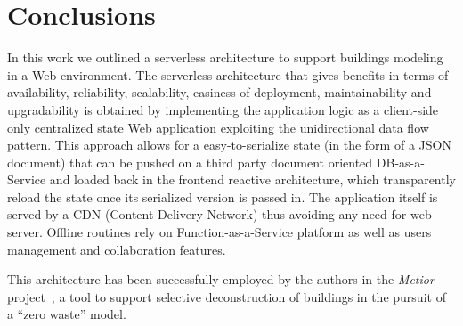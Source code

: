 \section{Conclusions}\label{sec:conclusions}

In this work we outlined a serverless architecture to support buildings modeling in a Web environment. The serverless  architecture that gives benefits in terms of availability, reliability, scalability, easiness of deployment, maintainability and upgradability is obtained by implementing the application logic as a client-side only centralized state Web application exploiting the unidirectional data flow pattern. This approach allows for a easy-to-serialize state (in the form of a JSON document) that can be pushed on a third party document oriented DB-as-a-Service and loaded back in the frontend reactive architecture, which transparently reload the state once its serialized version is passed in. The application itself is served by a CDN (Content Delivery Network) thus avoiding any need for web server. Offline routines rely on Function-as-a-Service platform as well as users management and collaboration features.

This architecture has been successfully employed by the authors in the \emph{Metior} project~\cite{grapp17}, a tool to support selective deconstruction of buildings in the pursuit of a ``zero waste'' model.
